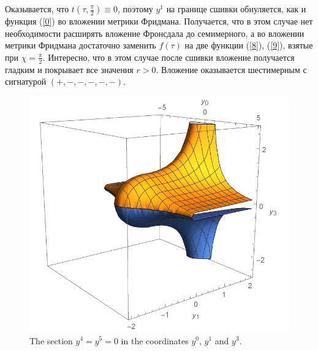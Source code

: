 \documentclass[12pt]{article}
\begin{document}
Оказывается, что $t(\tau, \frac{\pi}{2}) \equiv 0$, поэтому $y^1$ на границе сшивки обнуляется, как и функция (\ref{0}) во вложении метрики Фридмана. Получается, что в этом случае нет необходимости расширять вложение Фронсдала до семимерного, а во вложении метрики Фридмана достаточно заменить $f(\tau)$ на две функции  (\ref{8}), (\ref{9}), взятые при $\chi = \frac{\pi}{2}$. Интересно, что в этом случае после сшивки вложение получается гладким и покрывает все значения $r>0$. Вложение оказывается шестимерным с сигнатурой $(+, -, -, -, -, -)$.

\begin{figure}[h!]
	\centering
	\includegraphics[width=0.562\linewidth]{Hole_with_matter_embedding.pdf}
	\caption{\label{pic_emb}The section $y^4 = y^5 = 0$ in the coordinates $ y^0 $, $ y^1 $ and $ y^3 $.}
\end{figure}



\end{document}
